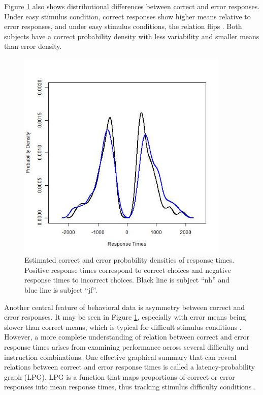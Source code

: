 \documentclass[12pt]{report}
\begin{document}
Figure \ref{fig:conddist} also shows distributional differences between correct and error responses. Under easy stimulus condition, correct responses show higher means relative to error responses, and under easy stimulus conditions, the relation flips \citep{Swe1972}. Both subjects have a correct probability density with less variability and smaller means than error density.

%
\begin{figure}
\centering
\includegraphics[width=0.9\textwidth]{Cond_distr_RRdata}
\caption{Estimated correct and error probability densities of response times. Positive response times correspond to correct choices and negative response times to incorrect choices. Black line is subject ``nh'' and blue line is subject ``jf''. }
\label{fig:conddist}
\end{figure}
%

Another central feature of behavioral data is asymmetry between correct and error responses. It may be seen in Figure \ref{fig:conddist}, especially with error means being slower than correct means, which is typical for difficult stimulus conditions \citep{Swe1972}. However, a more complete understanding of relation between correct and error response times arises from examining performance across several difficulty and instruction combinations. One effective graphical summary that can reveal relations between correct and error response times is called a latency-probability graph (LPG). LPG is a function that maps proportions of correct or error responses into mean response times, thus tracking stimulus difficulty conditions \citep{RatRou1998}.
\end{document}
